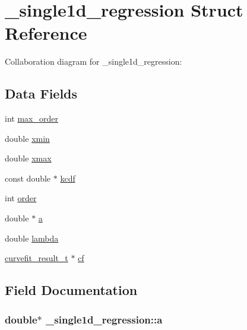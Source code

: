 \hypertarget{struct__single1d__regression}{}\section{\+\_\+single1d\+\_\+regression Struct Reference}
\label{struct__single1d__regression}


Collaboration diagram for \+\_\+single1d\+\_\+regression\+:
\subsection*{Data Fields}
\begin{DoxyCompactItemize}
\item 
int \hyperlink{struct__single1d__regression_aaa1dcb3d87135e2e34168a5db97e7436}{max\+\_\+order}
\item 
double \hyperlink{struct__single1d__regression_aaecbe6a0675eea847ce7da5994ec97e0}{xmin}
\item 
double \hyperlink{struct__single1d__regression_a84fc6de10079aa7ea68e019ddff0a859}{xmax}
\item 
const double $\ast$ \hyperlink{struct__single1d__regression_ac66bc857aec61ccf3095af2e41c1086b}{kcdf}
\item 
int \hyperlink{struct__single1d__regression_a9759de630ec4cebaf926d3a97ce6a396}{order}
\item 
double $\ast$ \hyperlink{struct__single1d__regression_aaa5b3bea4f874c5183099ca0f606b867}{a}
\item 
double \hyperlink{struct__single1d__regression_a3140a1b24fcc23cab6ec66f588f86722}{lambda}
\item 
\hyperlink{curvefit_8h_a8d64fc669633daad1b381d40274f9911}{curvefit\+\_\+result\+\_\+t} $\ast$ \hyperlink{struct__single1d__regression_a5eb1a7192b56d0c48cfd1a98c0d60b8e}{cf}
\end{DoxyCompactItemize}


\subsection{Field Documentation}
\subsubsection[{\texorpdfstring{a}{a}}]{\setlength{\rightskip}{0pt plus 5cm}double$\ast$ \+\_\+single1d\+\_\+regression\+::a}\hypertarget{struct__single1d__regression_aaa5b3bea4f874c5183099ca0f606b867}{}\label{struct__single1d__regression_aaa5b3bea4f874c5183099ca0f606b867}


